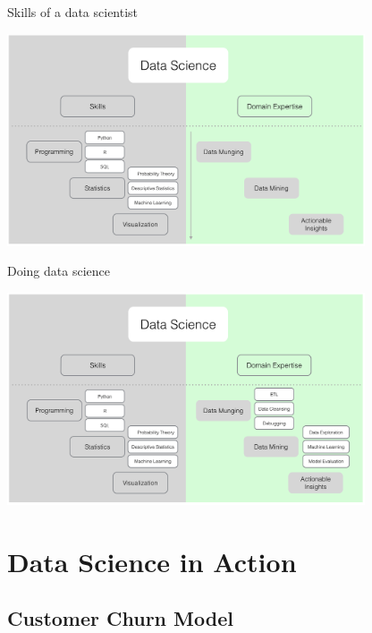 \documentclass[10pt]{beamer}
\begin{document}
    \begin{frame}{Skills of a data scientist}
      \begin{center}
        \includegraphics[width=300pt]{graphs/data_science_skills}
      \end{center}
    \end{frame}

    \begin{frame}{Doing data science}
      \begin{center}
        \includegraphics[width=300pt]{graphs/data_science_skills_domain}
      \end{center}
    \end{frame}

\section{Data Science in Action}

  \subsection{Customer Churn Model}
\end{document}
